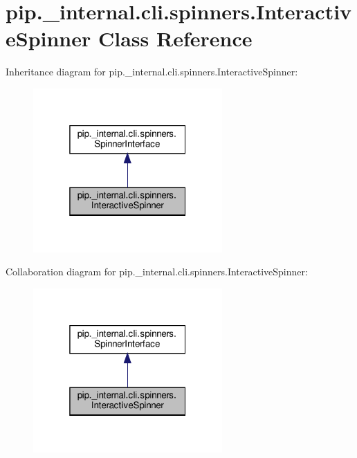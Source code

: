 \hypertarget{classpip_1_1__internal_1_1cli_1_1spinners_1_1InteractiveSpinner}{}\section{pip.\+\_\+internal.\+cli.\+spinners.\+Interactive\+Spinner Class Reference}
\label{classpip_1_1__internal_1_1cli_1_1spinners_1_1InteractiveSpinner}


Inheritance diagram for pip.\+\_\+internal.\+cli.\+spinners.\+Interactive\+Spinner\+:
\nopagebreak
\begin{figure}[H]
\begin{center}
\leavevmode
\includegraphics[width=205pt]{classpip_1_1__internal_1_1cli_1_1spinners_1_1InteractiveSpinner__inherit__graph}
\end{center}
\end{figure}


Collaboration diagram for pip.\+\_\+internal.\+cli.\+spinners.\+Interactive\+Spinner\+:
\nopagebreak
\begin{figure}[H]
\begin{center}
\leavevmode
\includegraphics[width=205pt]{classpip_1_1__internal_1_1cli_1_1spinners_1_1InteractiveSpinner__coll__graph}
\end{center}
\end{figure}
